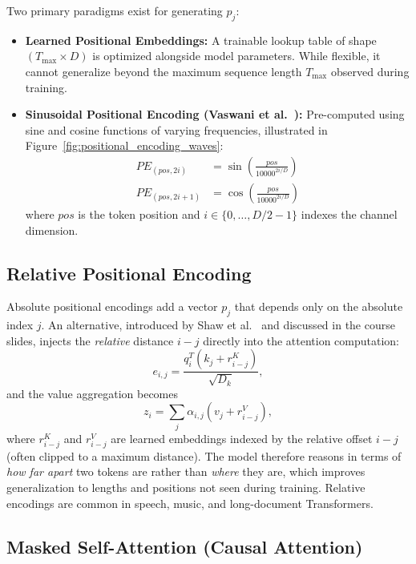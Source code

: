 Two primary paradigms exist for generating $p_j$:
\begin{itemize}[leftmargin=*]
    \item \textbf{Learned Positional Embeddings:} A trainable lookup table of shape $(T_{\text{max}} \times D)$ is optimized alongside model parameters. While flexible, it cannot generalize beyond the maximum sequence length $T_{\text{max}}$ observed during training.
    \item \textbf{Sinusoidal Positional Encoding (Vaswani et al.~\cite{vaswani2017attention}):} Pre-computed using sine and cosine functions of varying frequencies, illustrated in Figure~\ref{fig:positional_encoding_waves}:
    \begin{align}
        PE_{(pos, 2i)} &= \sin\left(\frac{pos}{10000^{2i/D}}\right) \\
        PE_{(pos, 2i+1)} &= \cos\left(\frac{pos}{10000^{2i/D}}\right)
    \end{align}
    where $pos$ is the token position and $i \in \{0, \dots, D/2 - 1\}$ indexes the channel dimension.
\end{itemize}

\subsection{Relative Positional Encoding}

Absolute positional encodings add a vector $p_j$ that depends only on the absolute index $j$. An alternative, introduced by Shaw et al.~\cite{shaw2018self} and discussed in the course slides, injects the \emph{relative} distance $i-j$ directly into the attention computation:
\begin{equation}
    e_{i,j} = \frac{q_i^T\left(k_j + r_{i-j}^{K}\right)}{\sqrt{D_k}},
\end{equation}
and the value aggregation becomes
\begin{equation}
    z_i = \sum_j \alpha_{i,j}\left(v_j + r_{i-j}^{V}\right),
\end{equation}
where $r_{i-j}^{K}$ and $r_{i-j}^{V}$ are learned embeddings indexed by the relative offset $i-j$ (often clipped to a maximum distance). The model therefore reasons in terms of \emph{how far apart} two tokens are rather than \emph{where} they are, which improves generalization to lengths and positions not seen during training. Relative encodings are common in speech, music, and long-document Transformers.

\subsection{Masked Self-Attention (Causal Attention)}

